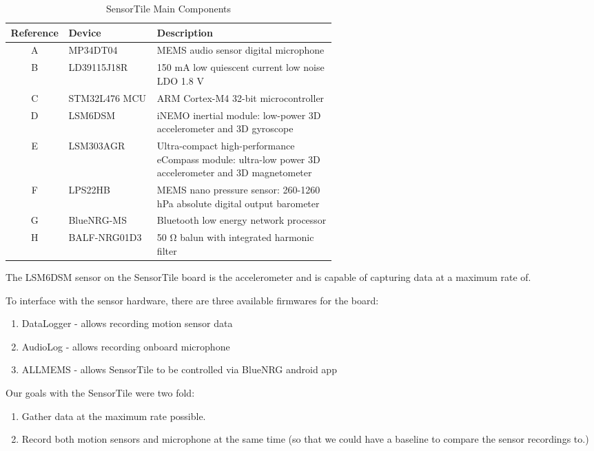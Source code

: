 \begin{table}[H]
\centering
\begin{tabular}{@{}|c|l|p{0.55\linewidth}|@{}}
\hline
\toprule
{\bf Reference} & {\bf Device} & {\bf Description} \\ \hline
\midrule
A & MP34DT04      & MEMS audio sensor digital microphone \\ \hline
B & LD39115J18R   & 150 mA low quiescent current low noise LDO 1.8 V \\ \hline
C & STM32L476 MCU & ARM Cortex-M4 32-bit microcontroller \\ \hline
D & LSM6DSM       & iNEMO inertial module: low-power 3D accelerometer and 3D gyroscope \\ \hline
E & LSM303AGR     & Ultra-compact high-performance eCompass module: ultra-low power 3D accelerometer and 3D magnetometer \\ \hline
F & LPS22HB       & MEMS nano pressure sensor: 260-1260 hPa absolute digital output barometer \\ \hline
G & BlueNRG-MS    & Bluetooth low energy network processor \\ \hline
H & BALF-NRG01D3  & 50 Ω balun with integrated harmonic filter \\ \hline
\bottomrule
\end{tabular}
\caption{SensorTile Main Components}
\label{table:sensortile}
\end{table}

\newpage

The LSM6DSM sensor on the SensorTile board is the accelerometer and is capable of capturing data at a maximum rate of.

To interface with the sensor hardware, there are three available firmwares for the board:

\begin{enumerate}
    \item DataLogger - allows recording motion sensor data
    \item AudioLog - allows recording onboard microphone
    \item ALLMEMS - allows SensorTile to be controlled via BlueNRG android app
\end{enumerate}

Our goals with the SensorTile were two fold:

\begin{enumerate}
\item Gather data at the maximum rate possible.
\item Record both motion sensors and microphone at the same time (so that we could have a baseline to compare the sensor recordings to.)
\end{enumerate}

